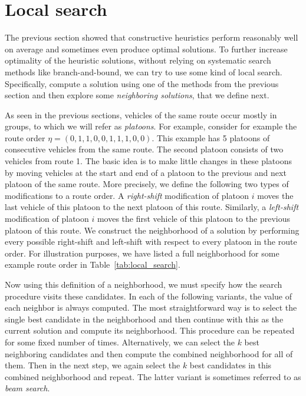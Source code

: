 \documentclass[a4paper]{article}
\theoremstyle{definition}
\theoremstyle{plain}
\begin{document}


\section{Local search}

The previous section showed that constructive heuristics perform reasonably well
on average and sometimes even produce optimal solutions. To further increase
optimality of the heuristic solutions, without relying on systematic search
methods like branch-and-bound, we can try to use some kind of local search.
Specifically, compute a solution using one of the methods from the previous
section and then explore some \textit{neighboring solutions}, that we define next.

As seen in the previous sections, vehicles of the same route occur mostly in
groups, to which we will refer as \textit{platoons}. For example, consider for example
the route order $\eta = (0, 1, 1, 0, 0, 1, 1, 1, 0, 0)$. This example has 5
platoons of consecutive vehicles from the same route. The second platoon
consists of two vehicles from route 1.
The basic idea is to make little changes in these platoons by moving vehicles at
the start and end of a platoon to the previous and next platoon of the same
route.
%
More precisely, we define the following two types of modifications to a route
order. A \textit{right-shift} modification of platoon $i$ moves the last vehicle of this
platoon to the next platoon of this route. Similarly, a \textit{left-shift} modification
of platoon $i$ moves the first vehicle of this platoon to the previous platoon
of this route.
%
We construct the neighborhood of a solution by performing every possible
right-shift and left-shift with respect to every platoon in the route order. For
illustration purposes, we have listed a full neighborhood for some example route
order in Table~\ref{tab:local_search}.

Now using this definition of a neighborhood, we must specify how the search
procedure visits these candidates.
In each of the following variants, the value of each neighbor is always computed.
%
The most straightforward way is to select the single best candidate in the
neighborhood and then continue with this as the current solution and compute its
neighborhood. This procedure can be repeated for some fixed number of times.
Alternatively, we can select the $k$ best neighboring candidates and then
compute the combined neighborhood for all of them. Then in the next step, we
again select the $k$ best candidates in this combined neighborhood and repeat.
The latter variant is sometimes referred to as \textit{beam search}.
\end{document}
